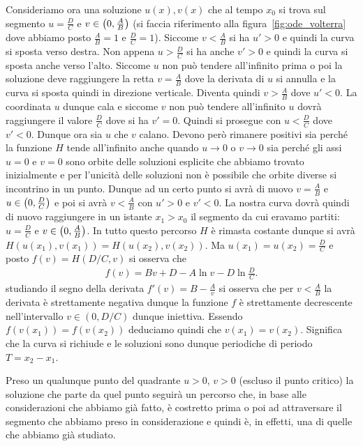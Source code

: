 Consideriamo ora una soluzione $u(x),v(x)$ che al tempo $x_0$ 
si trova sul segmento $u=\frac DC$ e $v\in \left(0,\frac A B\right)$
(si faccia riferimento alla figura~\ref{fig:ode_volterra} dove abbiamo 
posto $\frac AB=1$ e $\frac DC=1$).
Siccome $v<\frac A B$ si ha $u'>0$ e quindi la curva si sposta verso destra.
Non appena $u>\frac DC$ si ha anche $v'>0$ e quindi la curva si sposta 
anche verso l'alto. Siccome $u$ non può tendere all'infinito 
prima o poi la soluzione deve raggiungere la retta $v=\frac AB$ 
dove la derivata di $u$ si annulla e la curva si sposta quindi 
in direzione verticale. Diventa quindi $v>\frac AB$ dove $u'<0$.
La coordinata $u$ dunque cala e siccome $v$ non può tendere all'infinito 
$u$ dovrà raggiungere il valore $\frac DC$ dove si ha $v'=0$.
Quindi si prosegue con $u<\frac DC$ dove $v'<0$.
Dunque ora sia $u$ che $v$ calano.
Devono però rimanere positivi sia perché la funzione $H$ tende all'infinito 
anche quando $u\to 0$ o $v\to 0$ sia perché gli assi $u=0$ e $v=0$ 
sono orbite delle soluzioni esplicite che abbiamo trovato inizialmente 
e per l'unicità delle soluzioni non è possibile che orbite diverse 
si incontrino in un punto.
Dunque ad un certo punto si avrà di nuovo $v= \frac AB$ e $u\in \left(0,\frac DC\right)$
e poi si avrà $v<\frac AB$ con $u'>0$ e $v'<0$.
La nostra curva dovrà quindi di nuovo raggiungere in un istante $x_1>x_0$ 
il segmento da cui 
eravamo partiti: $u=\frac DC$ e $v\in \left(0,\frac AB\right)$.
In tutto questo percorso $H$ è rimasta costante dunque si avrà 
$H(u(x_1),v(x_1))=H(u(x_2),v(x_2))$. 
Ma $u(x_1)=u(x_2) = \frac DC$ e posto $f(v) = H(D/C,v)$ si osserva che 
\begin{align*}
   f(v) = B v + D - A \ln v - D \ln \frac DC.
\end{align*}
studiando il segno della derivata $f'(v)=B-\frac{A}{v}$ si osserva che per $v<\frac AB$ 
la derivata è strettamente negativa dunque la funzione $f$ è strettamente 
decrescente nell'intervallo $v\in(0,D/C)$ dunque iniettiva.
Essendo $f(v(x_1)) = f(v(x_2))$ deduciamo quindi che $v(x_1)=v(x_2)$.
Significa che la curva si richiude e le soluzioni sono dunque 
periodiche di periodo $T=x_2-x_1$. 

Preso un qualunque punto del quadrante $u>0$, $v>0$ (escluso il punto
critico) la soluzione che parte
da quel punto seguirà un percorso che, in base alle considerazioni che abbiamo già 
fatto, è costretto prima o poi ad attraversare il segmento che abbiamo 
preso in considerazione e quindi è, in effetti, una di quelle che 
abbiamo già studiato.

